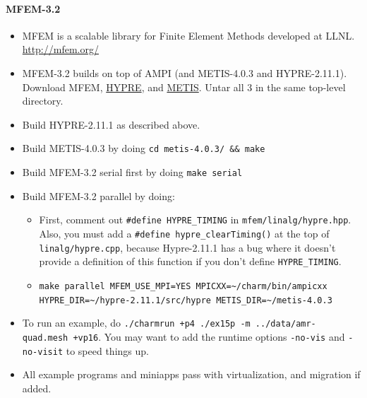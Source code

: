 \documentclass[10pt]{article}
\begin{document}
\paragraph{MFEM-3.2}
    \begin{itemize}
    \item
      MFEM is a scalable library for Finite Element Methods developed at
      LLNL. \url{http://mfem.org/}
    \item
      MFEM-3.2 builds on top of AMPI (and METIS-4.0.3 and
      HYPRE-2.11.1). Download {MFEM}, \href{https://computation.llnl.gov/project/linear_solvers/software.php}{HYPRE},
      and \href{http://glaros.dtc.umn.edu/gkhome/fsroot/sw/metis/OLD}{METIS}.
      Untar all 3 in the same top-level directory.
    \item
      Build HYPRE-2.11.1 as described above.
    \item
      Build METIS-4.0.3 by doing \texttt{cd metis-4.0.3/ \&\& make}
    \item
      Build MFEM-3.2 serial first by doing \texttt{make serial}
    \item
      Build MFEM-3.2 parallel by doing:

      \begin{itemize}
      \item
        First, comment out \texttt{\#define HYPRE\_TIMING} in
        \texttt{mfem/linalg/hypre.hpp}. Also, you must add a \texttt{\#define
        hypre\_clearTiming()} at the top of \texttt{linalg/hypre.cpp}, because
        Hypre-2.11.1 has a bug where it doesn't provide a definition of
        this function if you don't define \texttt{HYPRE\_TIMING}.
      \item
        \texttt{make parallel MFEM\_USE\_MPI=YES
        MPICXX=\textasciitilde{}/charm/bin/ampicxx
        HYPRE\_DIR=\textasciitilde{}/hypre-2.11.1/src/hypre
        METIS\_DIR=\textasciitilde{}/metis-4.0.3}
      \end{itemize}
    \item
      To run an example, do \texttt{./charmrun +p4 ./ex15p -m
      ../data/amr-quad.mesh +vp16}. You may want to add the runtime
      options \texttt{-no-vis} and \texttt{-no-visit} to speed things up.
    \item
      All example programs and miniapps pass with virtualization, and
      migration if added.
    \end{itemize}
\end{document}
